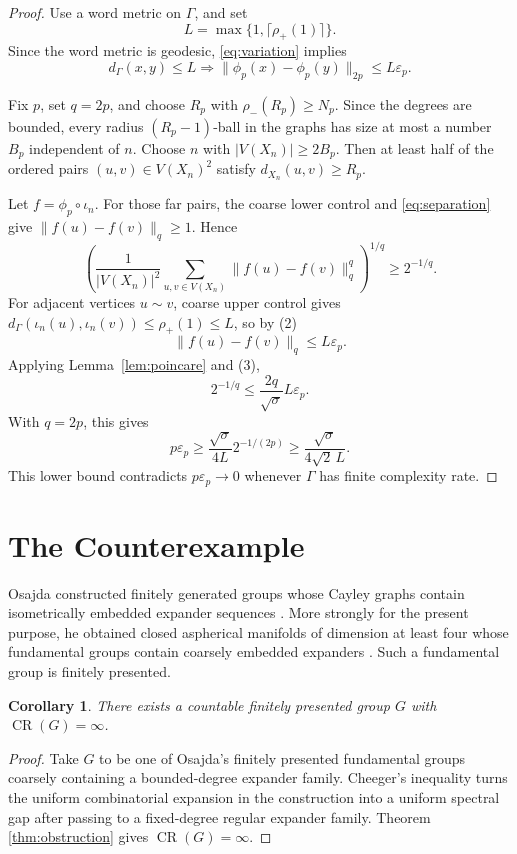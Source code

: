 \documentclass[11pt]{article}
\newtheorem{corollary}[theorem]{Corollary}
\newcommand{\CR}{\operatorname{CR}}
\newcommand{\eps}{\varepsilon}
\begin{document}
\begin{proof}
Use a word metric on \(\Gamma\), and set
\[
  L=\max\{1,\lceil \rho_+(1)\rceil\}.
\]
Since the word metric is geodesic, \eqref{eq:variation} implies
\[
 d_\Gamma(x,y)\le L
 \Longrightarrow
 \|\phi_p(x)-\phi_p(y)\|_{2p}\le L\eps_p. \tag{2}
\]

Fix \(p\), set \(q=2p\), and choose \(R_p\) with
\(\rho_-(R_p)\ge N_p\).  Since the degrees are bounded, every radius
\((R_p-1)\)-ball in the graphs has size at most a number \(B_p\) independent
of \(n\).  Choose \(n\) with \(|V(X_n)|\ge 2B_p\).  Then at least half of the
ordered pairs \((u,v)\in V(X_n)^2\) satisfy \(d_{X_n}(u,v)\ge R_p\).

Let \(f=\phi_p\circ \iota_n\).  For those far pairs, the coarse lower control
and \eqref{eq:separation} give \(\|f(u)-f(v)\|_q\ge 1\).  Hence
\[
 \left(
   \frac{1}{|V(X_n)|^2}
   \sum_{u,v\in V(X_n)}\|f(u)-f(v)\|_q^q
 \right)^{1/q}
 \ge 2^{-1/q}. \tag{3}
\]
For adjacent vertices \(u\sim v\), coarse upper control gives
\(d_\Gamma(\iota_n(u),\iota_n(v))\le \rho_+(1)\le L\), so by (2)
\[
  \|f(u)-f(v)\|_q\le L\eps_p.
\]
Applying Lemma~\ref{lem:poincare} and (3),
\[
  2^{-1/q}\le \frac{2q}{\sqrt\sigma}L\eps_p.
\]
With \(q=2p\), this gives
\[
  p\eps_p\ge
  \frac{\sqrt\sigma}{4L}2^{-1/(2p)}
  \ge \frac{\sqrt\sigma}{4\sqrt2\,L}.
\]
This lower bound contradicts \(p\eps_p\to 0\) whenever \(\Gamma\) has finite
complexity rate.
\end{proof}

\section*{The Counterexample}

Osajda constructed finitely generated groups whose Cayley graphs contain
isometrically embedded expander sequences \cite[Theorem 3.2 and Corollary
3.3]{Osajda2020}.  More strongly for the present purpose, he obtained closed
aspherical manifolds of dimension at least four whose fundamental groups
contain coarsely embedded expanders \cite[Corollary 3.5]{Osajda2020}.  Such a
fundamental group is finitely presented.

\begin{corollary}\label{cor:fpbad}
There exists a countable finitely presented group \(G\) with
\(\CR(G)=\infty\).
\end{corollary}

\begin{proof}
Take \(G\) to be one of Osajda's finitely presented fundamental groups
coarsely containing a bounded-degree expander family.  Cheeger's inequality
turns the uniform combinatorial expansion in the construction into a uniform
spectral gap after passing to a fixed-degree regular expander family.  Theorem
\ref{thm:obstruction} gives \(\CR(G)=\infty\).
\end{proof}
\end{document}
